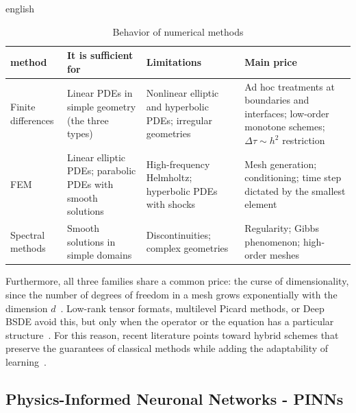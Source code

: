 \documentclass[0000.tex]{subfiles}
\begin{document}
\begin{hyphenrules}{english}
\begin{table}[ht]
\centering\small
\caption{Behavior of numerical methods}
\label{tab:cruce-clasicos}
\begin{tabularx}{\textwidth}{@{}l >{\raggedright\arraybackslash}X >{\raggedright\arraybackslash}X >{\raggedright\arraybackslash}X@{}}
\toprule
method & It is sufficient for & Limitations & Main price \\
\midrule
Finite differences & Linear PDEs in simple geometry (the three types) & Nonlinear elliptic and hyperbolic PDEs; irregular geometries & Ad hoc treatments at boundaries and interfaces; low-order monotone schemes; $\Delta \tau \sim h^2$ restriction \\
FEM & Linear elliptic PDEs; parabolic PDEs with smooth solutions & High-frequency Helmholtz; hyperbolic PDEs with shocks & Mesh generation; conditioning; time step dictated by the smallest element \\
Spectral methods & Smooth solutions in simple domains & Discontinuities; complex geometries & Regularity; Gibbs phenomenon; high-order meshes \\
\bottomrule
\end{tabularx}
\end{table}

Furthermore, all three families share a common price: the curse of dimensionality, since the number of degrees of freedom in a mesh grows exponentially with the 
dimension $d$~\cite{alkhatib2025numerical,nooraiepour2026partial}. Low-rank tensor formats, multilevel Picard methods, or Deep BSDE avoid this, but only when the 
operator or the equation has a particular structure~\cite{bachmayr2023low,dahmen2016tensor,weinan2021algorithms}. For this reason, recent literature points toward 
hybrid schemes that preserve the guarantees of classical methods while adding the adaptability of learning~\cite{nooraiepour2026partial}.

\subsection{Physics-Informed Neuronal Networks - PINNs}


\end{hyphenrules}
\end{document}
